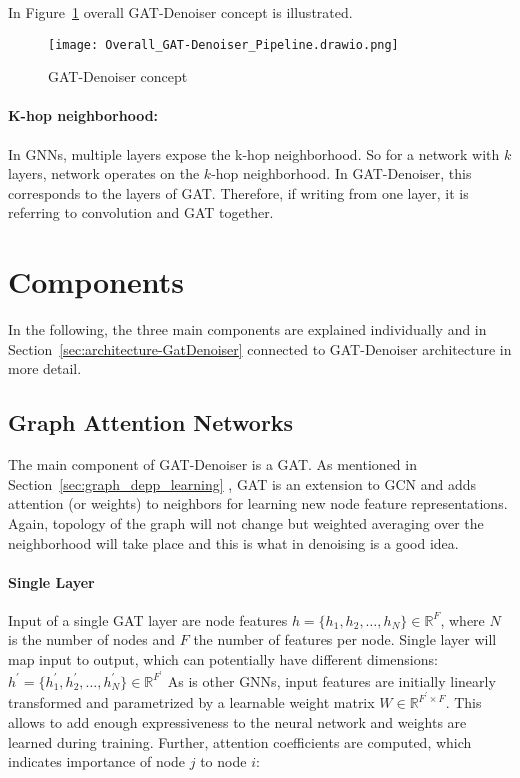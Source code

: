 In Figure~\ref{fig:overall-concept} overall GAT-Denoiser concept is illustrated.
\begin{figure}[t]
  \centering
  \label{fig:overall-concept}
  \texttt{[image: Overall\_GAT-Denoiser\_Pipeline.drawio.png]}
  \caption{GAT-Denoiser concept}
\end{figure}



\paragraph{K-hop neighborhood:}
In GNNs, multiple layers expose the k-hop neighborhood. So for a network with $k$ layers,
network operates on the $k$-hop neighborhood. In GAT-Denoiser, this corresponds
to the layers of GAT. Therefore, if writing from one layer, it is referring to convolution and GAT together.

\section{Components}
In the following, the three main components are explained individually
and in Section~\ref{sec:architecture-GatDenoiser} \textit{}
connected to GAT-Denoiser architecture in more detail.

\subsection{Graph Attention Networks}
The main component of GAT-Denoiser is a GAT.
As mentioned in Section~\ref{sec:graph_depp_learning} \textit{}, GAT is an extension to GCN and 
adds attention (or weights) to neighbors for learning new node feature representations. 
Again, topology of the graph will not change but weighted averaging over the neighborhood 
will take place and this is what in denoising is a good idea.

\paragraph{Single Layer}
Input of a single GAT layer are node features $h = \{ h_1, h_2, \dots , h_N \} \in \mathbb{R}^F$, 
where $N$ is the number of nodes and $F$ the number of features per node. 
Single layer will map input to output, which can potentially have different dimensions: 
$h^{\prime} = \{ h_1^{\prime}, h_2^{\prime}, \dots, h_N^{\prime} \} \in \mathbb{R}^{F^{\prime}} $
As is other GNNs, input features are initially linearly transformed and parametrized by a learnable weight matrix 
$W \in \mathbb{R}^{F^{\prime} \times F}$. 
This allows to add enough expressiveness to the neural network and weights are learned during training.
Further, attention coefficients are computed, which indicates importance of node $j$ to node $i$:

